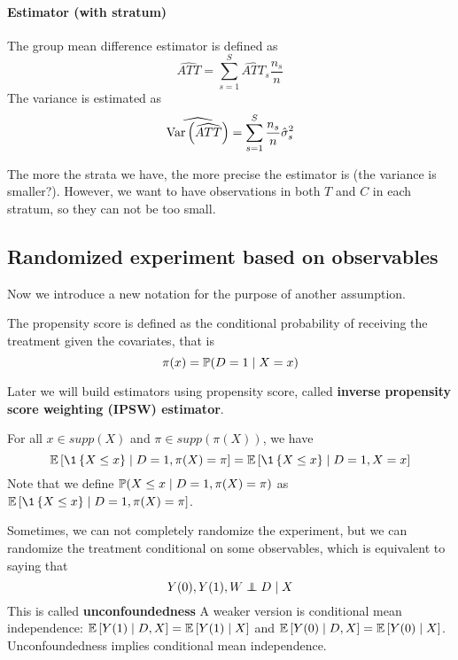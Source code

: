 \paragraph{Estimator (with stratum)} The group mean difference estimator is defined
as
\begin{equation*}
    \widehat{ATT}=\sum_{s=1}^S \widehat{ATT}_s\frac{n_s}{n}
\end{equation*}
The variance is estimated as
\begin{equation*}
    \widehat{\text{Var}\left(\widehat{ATT}\right)}=\sum_{s=1}^S \frac{n_s}{n}\hat{\sigma}_s^2
\end{equation*}

\begin{remark}
    The more the strata we have, the more precise the estimator is (the variance is smaller?). However, we want to have observations in both $T$ and $C$ in each stratum, so they can not be too small.
\end{remark}

\subsection{Randomized experiment based on observables}
Now we introduce a new notation for the purpose of another assumption.
\begin{definition}
    The propensity score is defined as the conditional probability of receiving the treatment given the covariates, that is \[\pi(x)=\mathbb{P}(D=1\mid X=x)\]
\end{definition}
\begin{remark}
    Later we will build estimators using propensity score, called \textbf{inverse propensity score weighting (IPSW) estimator}.
\end{remark}
\begin{proposition}
    For all $x\in supp(X)$ and $\pi \in supp(\pi(X))$, we have \begin{equation*}
        \E\bra{\1\set{X\le x} \mid D=1, \pi(X)=\pi}= \E\bra{\1\set{X\le x} \mid D=1, X=x}
    \end{equation*} Note that we define $\mathbb{P}(X\le x \mid D=1, \pi(X)=\pi)$ as $\E\bra{\1\set{X\le x} \mid D=1, \pi(X)=\pi}$.
\end{proposition}

Sometimes, we can not completely randomize the experiment, but we can randomize
the treatment conditional on some observables, which is equivalent to saying
that
\begin{equation}\label{eq:random_experiment_observables}
    Y(0),Y(1),W \perp\!\!\!\!\perp D \mid X
\end{equation} This is called \textbf{unconfoundedness}
A weaker version is conditional mean independence:
$\mathbb{E}\left[Y(1)\mid D,X\right]=\mathbb{E}\left[Y(1)\mid X\right]$ and $\mathbb{E}\left[Y(0)\mid D,X\right]=\mathbb{E}\left[Y(0)\mid X\right]$.
Unconfoundedness implies conditional mean independence.

